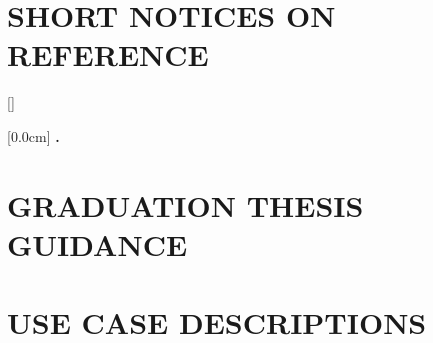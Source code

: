 \documentclass[a4paper,13pt,3p,twoside]{report}
\theoremstyle{definition}
\begin{document}
\newpage
\chapter*{SHORT NOTICES ON REFERENCE} %
\label{chapter:reference}


\newpage
\renewcommand\bibname{REFERENCE}
\printbibliography
{}

\appendixpage
\appendix
\addappheadtotoc

[]
\titlespacing*{\chapter}{0pt}{-20pt}{20pt}

[0.0cm]             %
{\bfseries\vspace{0.3cm}}                  %
{{\bfseries{\scshape} \thecontentslabel.\ }} %
{}         %
{\contentspage}

\chapter{GRADUATION THESIS GUIDANCE}


\newpage
\chapter{USE CASE DESCRIPTIONS}

\end{document}

